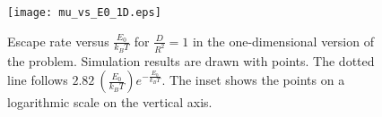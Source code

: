 \documentclass{article}
\begin{document}

\begin{figure}
  \centering
  \texttt{[image: mu\_vs\_E0\_1D.eps]}
  \caption{\label{mu_vs_E0_1D}Escape rate versus $\frac{E_0}{k_BT}$ for
           $\frac{D}{R^2} = 1$ in the one-dimensional version of the problem.
           Simulation results are drawn with points. The dotted line follows
           $2.82\ \left(\frac{E_0}{k_BT}\right) e^{-\frac{E_0}{k_BT}}$.
           The inset shows the points on a logarithmic scale on the vertical
           axis.}
\end{figure}
\end{document}

